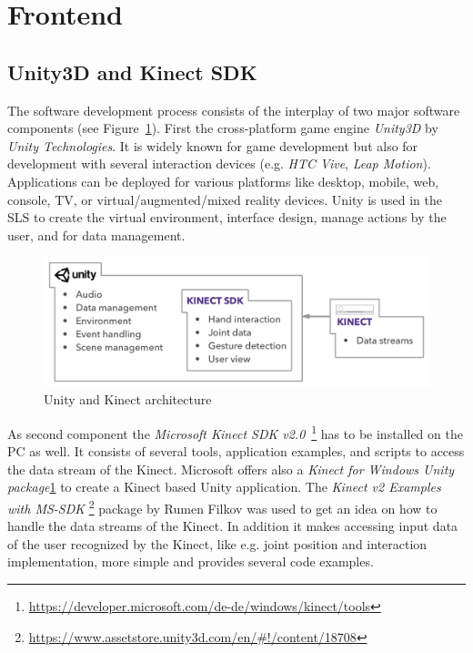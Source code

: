 \section{Frontend}\label{5_4_software}
\subsection{Unity3D and Kinect SDK}
The software development process consists of the interplay of two major software components (see Figure~\ref{fig:5_3_unityKinectArchitecture}).
First the cross-platform game engine \textit{Unity3D} by \textit{Unity Technologies}. It is widely known for game development but also for development with several interaction devices (e.g. \textit{HTC Vive}, \textit{Leap Motion}). Applications can be deployed for various platforms like desktop, mobile, web, console, TV, or virtual/augmented/mixed reality devices.
Unity is used in the SLS to create the virtual environment, interface design, manage actions by the user, and for data management.
\begin{figure}[htb]
	\centering
	\begin{minipage}[t]{1\linewidth}
		\centering
		\includegraphics[width=1\linewidth]{Pictures/5_3_unityKinectArchitecture}
		\caption{Unity and Kinect architecture}%
		\label{fig:5_3_unityKinectArchitecture}
	\end{minipage}
\end{figure}

As second component the \textit{Microsoft Kinect SDK v2.0}~\footnote{\label{fn:kinectTools}\url{https://developer.microsoft.com/de-de/windows/kinect/tools}} has to be installed on the PC as well.
It consists of several tools, application examples, and scripts to access the data stream of the Kinect.
Microsoft offers also a \textit{Kinect for Windows Unity package}\cref{fn:kinectTools} to create a Kinect based Unity application.
The \textit{Kinect v2 Examples with MS-SDK} \footnote{\url{https://www.assetstore.unity3d.com/en/\#!/content/18708}} package by Rumen Filkov was used to get an idea on how to handle the data streams of the Kinect.
In addition it makes accessing input data of the user recognized by the Kinect, like e.g. joint position and interaction implementation, more simple and provides several code examples.

